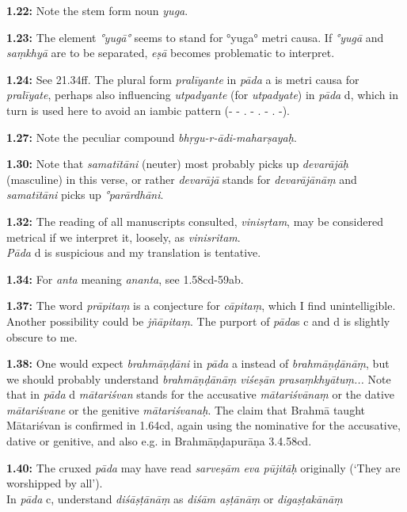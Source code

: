 \documentclass{article}
\newcommand{\vsnum}[1]{\textbf{#1}}
\newcommand{\skt}[1]{\textit{#1}}
\begin{document}
\vsnum{1.22: }Note the stem form noun \skt{yuga}.

\vsnum{1.23: }The element \skt{°yugā°} seems to stand for °yuga° metri causa. If \skt{°yugā} and \skt{saṃkhyā} are to be separated, \skt{eṣā} becomes problematic to interpret.

\vsnum{1.24: }See 21.34ff. The plural form \skt{pralīyante} in \skt{pāda} a is metri causa for \skt{pralīyate}, perhaps also influencing \skt{utpadyante} (for \skt{utpadyate}) in \skt{pāda} d, which in turn is used here to avoid an iambic pattern (- - . - . - . -).

\vsnum{1.27: }Note the peculiar compound \skt{bhṛgu-r-ādi-maharṣayaḥ}.

\vsnum{1.30: }Note that \skt{samatītāni} (neuter) most probably picks up \skt{devarājāḥ} (masculine) in this verse, or rather \skt{devarājā} stands for \skt{devarājānāṃ} and \skt{samatītāni} picks up \skt{°parārdhāni}.

\vsnum{1.32: }The reading of all manuscripts consulted, \skt{vinisṛtam}, may be considered metrical if we interpret it, loosely, as \skt{vinisritam}. \\ \skt{Pāda} d is suspicious and my translation is tentative.

\vsnum{1.34: }For \skt{anta} meaning \skt{ananta}, see 1.58cd-59ab.

\vsnum{1.37: }The word \skt{prāpitaṃ} is a conjecture for \skt{cāpitaṃ}, which I find unintelligible. Another possibility could be \skt{jñāpitaṃ}. The purport of \skt{pāda}s c and d is slightly obscure to me.

\vsnum{1.38: }One would expect \skt{brahmāṇḍāni} in \skt{pāda} a instead of \skt{brahmāṇḍānāṃ}, but we should probably understand \skt{brahmāṇḍānāṃ viśeṣān prasaṃkhyātuṃ...} Note that in \skt{pāda} d \skt{mātariśvan} stands for the accusative \skt{mātariśvānaṃ} or the dative \skt{mātariśvane} or the genitive \skt{mātariśvanaḥ}. The claim that Brahmā taught Mātariśvan is confirmed in 1.64cd, again using the nominative for the accusative, dative or genitive, and also e.g. in Brahmāṇḍapurāṇa 3.4.58cd.

\vsnum{1.40: }The cruxed \skt{pāda} may have read \skt{sarveṣām eva pūjitāḥ} originally (`They are worshipped by all'). \\ In \skt{pāda} c, understand \skt{diśāṣṭānāṃ} as \skt{diśām aṣṭānāṃ} or \skt{digaṣṭakānāṃ}
\end{document}
